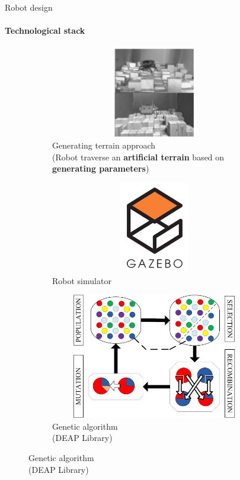 \documentclass[aspectratio=169,xcolor=table]{beamer}
\begin{document}
\begin{frame}[c]{Robot design}
    \framesubtitle{Technological stack}
    \vspace{-0.9cm}
    \begin{figure}[H]
        \begin{subfigure}[t]{0.32\textwidth}
            \centering\includegraphics[height=4cm,width=1\textwidth,keepaspectratio]{c1_paper.png}
            \caption*{\small Generating terrain approach \\ (Robot traverse an \textbf{artificial terrain} based on \textbf{generating parameters})}
        \end{subfigure}
        \hfill
        \begin{subfigure}[t]{0.32\textwidth}
            \centering\includegraphics[height=4cm,width=1\textwidth,keepaspectratio]{gazebo_logo.png}
            \caption*{Robot simulator}
        \end{subfigure}
        \hfill
        \begin{subfigure}[t]{0.32\textwidth}
            \centering\includegraphics[height=5.5cm,width=1\textwidth,keepaspectratio]{gen_algo.jpg}
            \caption*{Genetic algorithm \\ (DEAP Library)}
        \end{subfigure}
        \hfill
    \end{figure}
\end{frame}
\end{document}
